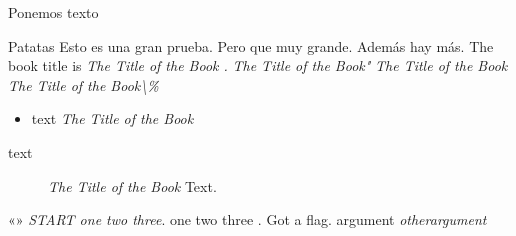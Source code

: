Ponemos texto

\salto



\lulu

Patatas
Esto es una gran prueba. Pero que muy grande. Además
hay más.
The book title is
\emph{The Title of the Book .}
\emph{The Title of the Book"}
\emph{The Title of the Book}
\emph{The Title of the Book\textbackslash{}\%}
\begin{itemize}
\item text
\emph{The Title of the Book}
\end{itemize}
\begin{description}
\item[text] \emph{The Title of the Book}
Text.
\end{description}
«»
\emph{START one two three}.
one two three .
Got a flag.
argument
\emph{otherargument}

